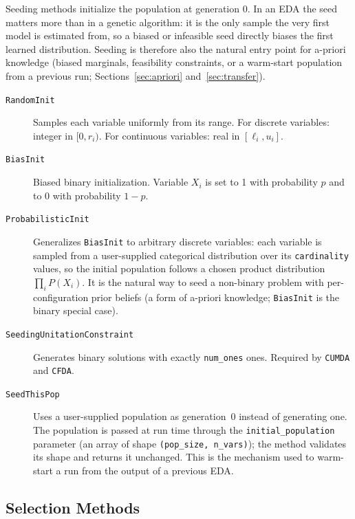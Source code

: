 \documentclass[a4paper,11pt]{article}
\begin{document}
Seeding methods initialize the population at generation 0. In an EDA the seed
matters more than in a genetic algorithm: it is the only sample the very first
model is estimated from, so a biased or infeasible seed directly biases the
first learned distribution. Seeding is therefore also the natural entry point
for a-priori knowledge (biased marginals, feasibility constraints, or a
warm-start population from a previous run; Sections~\ref{sec:apriori}
and~\ref{sec:transfer}).

\begin{description}
  \item[\texttt{RandomInit}]
    Samples each variable uniformly from its range.
    For discrete variables: integer in $[0, r_i)$.
    For continuous variables: real in $[\ell_i, u_i]$.

  \item[\texttt{BiasInit}]
    Biased binary initialization.  Variable $X_i$ is set to 1 with probability
    $p$ and to 0 with probability $1-p$.

  \item[\texttt{ProbabilisticInit}]
    Generalizes \texttt{BiasInit} to arbitrary discrete variables: each variable
    is sampled from a user-supplied categorical distribution over its
    \texttt{cardinality} values, so the initial population follows a chosen
    product distribution $\prod_i P(X_i)$. It is the natural way to seed a
    non-binary problem with per-configuration prior beliefs (a form of a-priori
    knowledge; \texttt{BiasInit} is the binary special case).

  \item[\texttt{SeedingUnitationConstraint}]
    Generates binary solutions with exactly \texttt{num\_ones} ones.
    Required by \texttt{CUMDA} and \texttt{CFDA}.

  \item[\texttt{SeedThisPop}]
    Uses a user-supplied population as generation~0 instead of generating one.
    The population is passed at run time through the \texttt{initial\_population}
    parameter (an array of shape \texttt{(pop\_size, n\_vars)}); the method
    validates its shape and returns it unchanged. This is the mechanism used to
    warm-start a run from the output of a previous EDA.
\end{description}

\subsection{Selection Methods}
\end{document}
